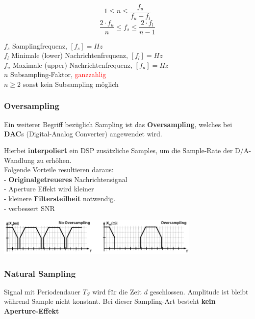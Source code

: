 \begin{minipage}[t][2.2cm][c]{8cm}
$$ 1 \leq n \leq \frac{f_u}{f_u - f_l} $$
$$ \frac{2 \cdot f_u}{n} \leq f_s \leq \frac{2 \cdot f_l}{n-1}$$
\end{minipage}
\begin{minipage}[t][2.2cm][c]{9cm}
	$f_s$ Samplingfrequenz, $[f_s] = Hz$ \\
	$f_l$ Minimale (lower) Nachrichtenfrequenz, $[f_l] = Hz$ \\
	$f_u$ Maximale (upper) Nachrichtenfrequenz, $[f_u] = Hz$ \\
	$n$ Subsampling-Faktor, \textcolor{red}{ganzzahlig} \\
	$n \geq 2$ sonst kein Subsampling möglich \\
\end{minipage}

\subsubsection{Oversampling}
Ein weiterer Begriff bezüglich Sampling ist das \textbf{Oversampling}, welches bei \textbf{DAC}s
(Digital-Analog Converter) angewendet wird. \\
	\begin{minipage}{9cm}
		Hierbei \textbf{interpoliert} ein DSP zusätzliche Samples, um die Sample-Rate der D/A-Wandlung zu erhöhen.\\
		Folgende Vorteile resultieren daraus:\\ 
		- \textbf{Originalgetreueres} Nachrichtensignal \\
		- Aperture Effekt wird kleiner\\
		- kleinere \textbf{Filtersteilheit} notwendig.\\
		- verbessert SNR
		
	\end{minipage}
	\begin{minipage}{10cm}
		\includegraphics[width=10cm]{bilder/dig_oversampling.png}
	\end{minipage}

\subsubsection{Natural Sampling }
Signal mit Periodendauer $T_S$ wird für die Zeit $d$ geschlossen. Amplitude ist bleibt
während Sample nicht konstant. Bei dieser Sampling-Art besteht \textbf{kein Aperture-Effekt}\\

